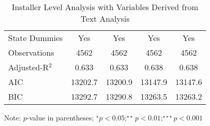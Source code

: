 \begin{table}[H]
\begin{threeparttable}[t]
\begin{tabular}{@{}lcccc@{}}
State Dummies               & Yes        & Yes        & Yes           &Yes\\                          
Observations                & 4562        & 4562        & 4562        & 4562        \\
Adjusted-R$^2$                          & 0.633       & 0.633       & 0.638       & 0.638       \\
AIC                         & 13202.7     & 13200.9     & 13147.9     & 13147.6     \\
BIC                         & 13292.7     & 13290.8     & 13263.5     & 13263.2     \\ \bottomrule
\end{tabular}%
\begin{tablenotes}
\item Note: $p$-value in parentheses; $^\star p<0.05;^{\star\star} p<0.01;^{\star\star\star} p<0.001$
\end{tablenotes}
\end{threeparttable}
\caption{Installer Level Analysis with Variables Derived from Text Analysis}
\label{reg_ind_withtext}
\end{table} 